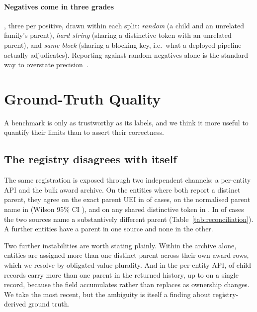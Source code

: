 \paragraph{Negatives come in three grades}, three per positive, drawn within each split:
\emph{random} (a child and an unrelated family's parent), \emph{hard string} (sharing a
distinctive token with an unrelated parent), and \emph{same block} (sharing a blocking
key, i.e.\ what a deployed pipeline actually adjudicates). Reporting against random
negatives alone is the standard way to overstate
precision~\citep{papadakis2023benchmarking}.

\section{Ground-Truth Quality}
\label{sec:quality}

A benchmark is only as trustworthy as its labels, and we think it more useful to
quantify their limits than to assert their correctness.

\subsection{The registry disagrees with itself}

The same registration is exposed through two independent channels: a per-entity API and
the bulk award archive. On the \ReconBoth entities where both report a distinct parent,
they agree on the exact parent UEI in \ReconAgreeUei of cases, on the normalised parent
name in \ReconAgreeName (Wilson 95\% CI \ReconAgreeNameCI), and on any shared distinctive
token in \ReconAgreeToken. In \ReconDisagreePct of cases the two sources name a
substantively different parent (Table~\ref{tab:reconciliation}). A further \ReconOnlyOne
entities have a parent in one source and none in the other.



Two further instabilities are worth stating plainly. Within the archive alone,
\ArchiveConflicting entities are assigned more than one distinct parent across their own
award rows, which we resolve by obligated-value plurality. And in the per-entity API,
\AuditMultiParent of \AuditChildRecords child records carry more than one parent in the
returned history, up to \AuditMaxParents on a single record, because the field
accumulates rather than replaces as ownership changes. We take the most recent, but the
ambiguity is itself a finding about registry-derived ground truth.

